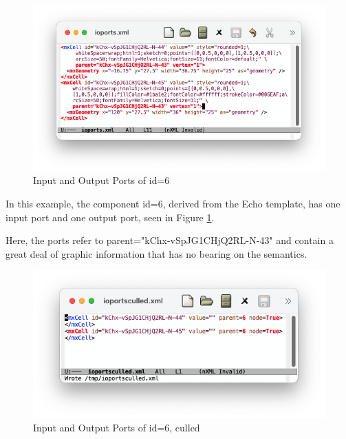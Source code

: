 \documentclass[10pt,anonymous,review]{acmart}
\begin{document}
 \vspace{5\baselineskip}


\begin{figure}
    \centering
    \includegraphics[trim=1cm 1.9cm 1cm 1cm, clip, scale=0.4]{./media/ioports.png}
    \caption{Input and Output Ports of id=6}
    \label{ioports}
\end{figure}
\vspace{1.5\baselineskip}
In this example, the component id=6, derived from the Echo template, has one input port and one output port, seen in Figure \ref{ioports}.

 \vspace{6.2\baselineskip}

Here, the ports refer to parent="kChx-vSpJG1CHjQ2RL-N-43" and contain a great deal of graphic information that has no bearing on the semantics.

\newpage

\begin{figure}
\centering
    \includegraphics[trim=1cm 1.9cm 1cm 1cm, clip, scale=0.37]{./media/ioportsculled.png}
    \caption{Input and Output Ports of id=6, culled}
    \label{ioportsculled}
\end{figure}
\end{document}
